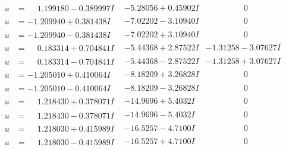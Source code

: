 \documentclass[1p]{elsarticle_modified}
\theoremstyle{definition}
\begin{document}
$$\begin{array}{c|c|c}
\begin{aligned}
u &= \phantom{-}1.199180 - 0.389997 I\end{aligned}
 & -5.28056 + 0.45902 I & \phantom{-0.000000 } 0 \\ \hline\begin{aligned}
u &= -1.209940 + 0.381438 I\end{aligned}
 & -7.02202 - 3.10940 I & \phantom{-0.000000 } 0 \\ \hline\begin{aligned}
u &= -1.209940 - 0.381438 I\end{aligned}
 & -7.02202 + 3.10940 I & \phantom{-0.000000 } 0 \\ \hline\begin{aligned}
u &= \phantom{-}0.183314 + 0.704841 I\end{aligned}
 & -5.44368 + 2.87522 I & -1.31258 - 3.07627 I \\ \hline\begin{aligned}
u &= \phantom{-}0.183314 - 0.704841 I\end{aligned}
 & -5.44368 - 2.87522 I & -1.31258 + 3.07627 I \\ \hline\begin{aligned}
u &= -1.205010 + 0.410064 I\end{aligned}
 & -8.18209 + 3.26828 I & \phantom{-0.000000 } 0 \\ \hline\begin{aligned}
u &= -1.205010 - 0.410064 I\end{aligned}
 & -8.18209 - 3.26828 I & \phantom{-0.000000 } 0 \\ \hline\begin{aligned}
u &= \phantom{-}1.218430 + 0.378071 I\end{aligned}
 & -14.9696 + 5.4032 I & \phantom{-0.000000 } 0 \\ \hline\begin{aligned}
u &= \phantom{-}1.218430 - 0.378071 I\end{aligned}
 & -14.9696 - 5.4032 I & \phantom{-0.000000 } 0 \\ \hline\begin{aligned}
u &= \phantom{-}1.218030 + 0.415989 I\end{aligned}
 & -16.5257 - 4.7100 I & \phantom{-0.000000 } 0 \\ \hline\begin{aligned}
u &= \phantom{-}1.218030 - 0.415989 I\end{aligned}
 & -16.5257 + 4.7100 I & \phantom{-0.000000 } 0 \\ \hline\begin{aligned}

\end{aligned}
\end{array}$$
\end{document}
